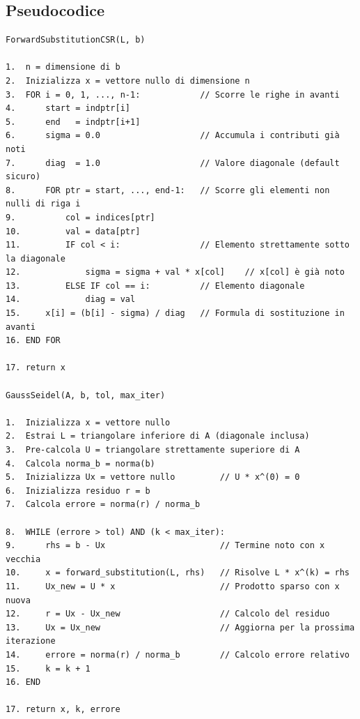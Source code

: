 \documentclass[a4paper, 12pt]{report}
\begin{document}
\subsection*{Pseudocodice}
\begin{verbatim}
ForwardSubstitutionCSR(L, b)

1.  n = dimensione di b
2.  Inizializza x = vettore nullo di dimensione n
3.  FOR i = 0, 1, ..., n-1:            // Scorre le righe in avanti
4.      start = indptr[i]
5.      end   = indptr[i+1]
6.      sigma = 0.0                    // Accumula i contributi già noti
7.      diag  = 1.0                    // Valore diagonale (default sicuro)
8.      FOR ptr = start, ..., end-1:   // Scorre gli elementi non nulli di riga i
9.          col = indices[ptr]
10.         val = data[ptr]
11.         IF col < i:                // Elemento strettamente sotto la diagonale
12.             sigma = sigma + val * x[col]    // x[col] è già noto
13.         ELSE IF col == i:          // Elemento diagonale
14.             diag = val
15.     x[i] = (b[i] - sigma) / diag   // Formula di sostituzione in avanti
16. END FOR

17. return x

GaussSeidel(A, b, tol, max_iter)

1.  Inizializza x = vettore nullo
2.  Estrai L = triangolare inferiore di A (diagonale inclusa)
3.  Pre-calcola U = triangolare strettamente superiore di A
4.  Calcola norma_b = norma(b)
5.  Inizializza Ux = vettore nullo         // U * x^(0) = 0
6.  Inizializza residuo r = b
7.  Calcola errore = norma(r) / norma_b

8.  WHILE (errore > tol) AND (k < max_iter):
9.      rhs = b - Ux                       // Termine noto con x vecchia
10.     x = forward_substitution(L, rhs)   // Risolve L * x^(k) = rhs
11.     Ux_new = U * x                     // Prodotto sparso con x nuova
12.     r = Ux - Ux_new                    // Calcolo del residuo
13.     Ux = Ux_new                        // Aggiorna per la prossima iterazione
14.     errore = norma(r) / norma_b        // Calcolo errore relativo
15.     k = k + 1
16. END

17. return x, k, errore
\end{verbatim}
\end{document}
